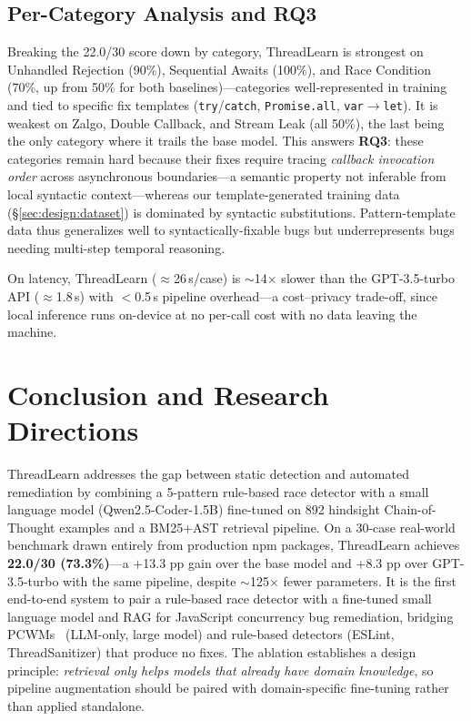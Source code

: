 \documentclass[runningheads]{llncs}
\begin{document}
\subsection{Per-Category Analysis and RQ3}
\label{sec:eval:category}

Breaking the 22.0/30 score down by category, ThreadLearn is strongest on
Unhandled Rejection (90\%), Sequential Awaits (100\%), and Race Condition
(70\%, up from 50\% for both baselines)---categories well-represented in
training and tied to specific fix templates (\texttt{try}/\texttt{catch},
\texttt{Promise.all}, \texttt{var}$\to$\texttt{let}).
It is weakest on Zalgo, Double Callback, and Stream Leak (all 50\%), the
last being the only category where it trails the base model.
This answers \textbf{RQ3}: these categories remain hard because their
fixes require tracing \emph{callback invocation order} across asynchronous
boundaries---a semantic property not inferable from local syntactic
context---whereas our template-generated training data
(\S\ref{sec:design:dataset}) is dominated by syntactic substitutions.
Pattern-template data thus generalizes well to syntactically-fixable bugs
but underrepresents bugs needing multi-step temporal reasoning.

On latency, ThreadLearn ($\approx$26\,s/case) is $\sim$14$\times$ slower
than the GPT-3.5-turbo API ($\approx$1.8\,s) with $<$0.5\,s pipeline
overhead---a cost--privacy trade-off, since local inference runs on-device
at no per-call cost with no data leaving the machine.

\section{Conclusion and Research Directions}
\label{sec:conclusion}

ThreadLearn addresses the gap between static detection and automated
remediation by combining a 5-pattern rule-based race detector with a small
language model (Qwen2.5-Coder-1.5B) fine-tuned on 892 hindsight
Chain-of-Thought examples and a BM25+AST retrieval pipeline.
On a 30-case real-world benchmark drawn entirely from production npm
packages, ThreadLearn achieves \textbf{22.0/30 (73.3\%)}---a $+$13.3 pp
gain over the base model and $+$8.3 pp over GPT-3.5-turbo with the same
pipeline, despite $\sim$125$\times$ fewer parameters.
It is the first end-to-end system to pair a rule-based race detector with
a fine-tuned small language model and RAG for JavaScript concurrency bug
remediation, bridging PCWMs~\cite{pcwms2026} (LLM-only, large model) and
rule-based detectors (ESLint, ThreadSanitizer) that produce no fixes.
The ablation establishes a design principle: \emph{retrieval only helps
models that already have domain knowledge}, so pipeline augmentation
should be paired with domain-specific fine-tuning rather than applied
standalone.
\end{document}
